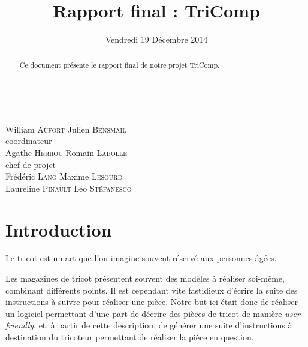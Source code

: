\documentclass{article}
\title{Rapport final : TriComp}
\author{}
\date{Vendredi 19 Décembre 2014}
\begin{document}
\makeatletter %
  \begin{titlepage}
    \begin{center}
       {\LARGE \@title} \\
       \vspace{2cm} {\large \@date}
       \vspace{3cm}
    \end{center}
       {\large {William \textsc{Aufort} \hfill Julien
           \textsc{Bensmail} \\}
    \vspace{1cm} {\hfill coordinateur \\} {Agathe \textsc{Herrou}
      \hfill Romain \textsc{Labolle} \\}
       \vspace{1cm} {chef de projet \\}
       \vspace{1.5cm} {Frédéric \textsc{Lang} \hfill Maxime
         \textsc{Lesourd} \\} {Laureline \textsc{Pinault} \hfill Léo
         \textsc{Stéfanesco} \\}}
       \vspace{2.5cm}
    \begin{abstract}
	Ce document présente le rapport final de notre projet TriComp.
    \end{abstract}
  \end{titlepage}
\makeatother

\newpage

\tableofcontents

\newpage

\section*{Introduction}

Le tricot est un art que l'on imagine souvent réservé aux personnes
âgées.

Les magazines de tricot présentent souvent des modèles à réaliser
soi-même, combinant différents points. Il est cependant vite
fastidieux d'écrire la suite des instructions à suivre pour réaliser
une pièce. Notre but ici était donc de réaliser un logiciel permettant
d'une part de décrire des pièces de tricot de manière
\emph{user-friendly}, et, à partir de cette description, de générer
une suite d'instructions à destination du tricoteur permettant de
réaliser la pièce en question.
\end{document}
